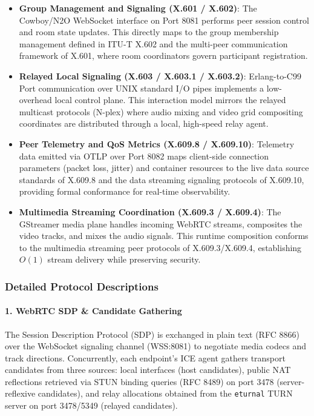 \documentclass{article}
\begin{document}
\begin{itemize}
    \item \textbf{Group Management and Signaling (X.601 / X.602)}:
          The Cowboy/N2O WebSocket interface on Port 8081 performs peer session control and room state updates.
          This directly maps to the group membership management defined in ITU-T X.602 and the multi-peer
          communication framework of X.601, where room coordinators govern participant registration.
    \item \textbf{Relayed Local Signaling (X.603 / X.603.1 / X.603.2)}:
          Erlang-to-C99 Port communication over UNIX standard I/O pipes implements a low-overhead local control plane.
          This interaction model mirrors the relayed multicast protocols (N-plex) where audio mixing and video grid
          compositing coordinates are distributed through a local, high-speed relay agent.
    \item \textbf{Peer Telemetry and QoS Metrics (X.609.8 / X.609.10)}:
          Telemetry data emitted via OTLP over Port 8082 maps client-side connection parameters (packet loss, jitter)
          and container resources to the live data source standards of X.609.8 and the data streaming signaling
          protocols of X.609.10, providing formal conformance for real-time observability.
    \item \textbf{Multimedia Streaming Coordination (X.609.3 / X.609.4)}:
          The GStreamer media plane handles incoming WebRTC streams, composites the video tracks,
          and mixes the audio signals. This runtime composition conforms to the multimedia streaming
          peer protocols of X.609.3/X.609.4, establishing $O(1)$ stream delivery while preserving security.
\end{itemize}

\newpage
\subsubsection{Detailed Protocol Descriptions}

\paragraph{1. WebRTC SDP \& Candidate Gathering}

The Session Description Protocol (SDP) is exchanged in plain text (RFC 8866) over the WebSocket
signaling channel (WSS:8081) to negotiate media codecs and track directions. Concurrently,
each endpoint's ICE agent gathers transport candidates from three sources: local
interfaces (host candidates), public NAT reflections retrieved via STUN binding
queries (RFC 8489) on port 3478 (server-reflexive candidates), and relay allocations
obtained from the \texttt{eturnal} TURN server on port 3478/5349 (relayed candidates).
\end{document}
